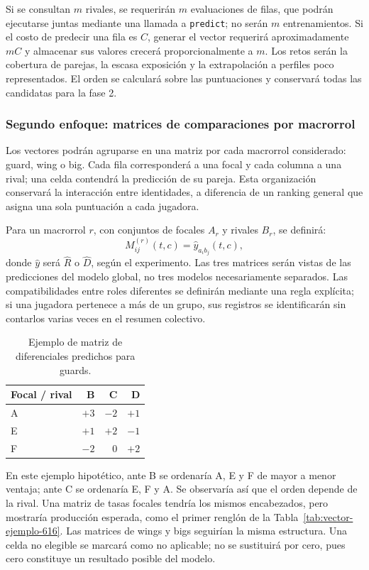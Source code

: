 Si se consultan $m$ rivales, se requerirán $m$ evaluaciones de filas, que podrán ejecutarse juntas mediante una llamada a \texttt{predict}; no serán $m$ entrenamientos. Si el costo de predecir una fila es $C$, generar el vector requerirá aproximadamente $mC$ y almacenar sus valores crecerá proporcionalmente a $m$. Los retos serán la cobertura de parejas, la escasa exposición y la extrapolación a perfiles poco representados. El orden se calculará sobre las puntuaciones y conservará todas las candidatas para la fase 2.

\subsubsection*{Segundo enfoque: matrices de comparaciones por macrorrol}
Los vectores podrán agruparse en una matriz por cada macrorrol considerado: guard, wing o big. Cada fila corresponderá a una focal y cada columna a una rival; una celda contendrá la predicción de su pareja. Esta organización conservará la interacción entre identidades, a diferencia de un ranking general que asigna una sola puntuación a cada jugadora.

Para un macrorrol $r$, con conjuntos de focales $A_r$ y rivales $B_r$, se definirá:
\[
M^{(r)}_{ij}(t,c)=\widehat y_{a_i b_j}(t,c),
\]
donde $\widehat y$ será $\widehat R$ o $\widehat D$, según el experimento. Las tres matrices serán vistas de las predicciones del modelo global, no tres modelos necesariamente separados. Las compatibilidades entre roles diferentes se definirán mediante una regla explícita; si una jugadora pertenece a más de un grupo, sus registros se identificarán sin contarlos varias veces en el resumen colectivo.

\begin{table}[htbp]
\centering
\small
\caption{Ejemplo de matriz de diferenciales predichos para guards.}
\label{tab:matriz-macrorrol-616}
\begin{tabular}{@{}lrrr@{}}
\toprule
\textbf{Focal / rival} & \textbf{B} & \textbf{C} & \textbf{D}\\
\midrule
A & $+3$ & $-2$ & $+1$\\
E & $+1$ & $+2$ & $-1$\\
F & $-2$ & $0$ & $+2$\\
\bottomrule
\end{tabular}
\end{table}

En este ejemplo hipotético, ante B se ordenaría A, E y F de mayor a menor ventaja; ante C se ordenaría E, F y A. Se observaría así que el orden depende de la rival. Una matriz de tasas focales tendría los mismos encabezados, pero mostraría producción esperada, como el primer renglón de la Tabla~\ref{tab:vector-ejemplo-616}. Las matrices de wings y bigs seguirían la misma estructura. Una celda no elegible se marcará como no aplicable; no se sustituirá por cero, pues cero constituye un resultado posible del modelo.


